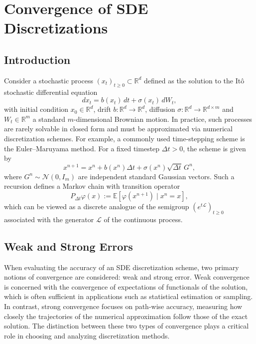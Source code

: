\documentclass{article}
\begin{document}
\section{Convergence of SDE Discretizations}

\subsection{Introduction}

Consider a stochastic process $(x_t)_{t \geq 0} \subset \mathbb{R}^d$ defined as the solution to the Itô stochastic differential equation
\[
dx_t = b(x_t)\,dt + \sigma(x_t)\,dW_t,
\]
with initial condition $x_0 \in \mathbb{R}^d$, drift $b: \mathbb{R}^d \to \mathbb{R}^d$, diffusion $\sigma: \mathbb{R}^d \to \mathbb{R}^{d \times m}$ and $W_t \in \mathbb{R}^m$ a standard $m$-dimensional Brownian motion. In practice, such processes are rarely solvable in closed form and must be approximated via numerical discretization schemes. For example, a commonly used time-stepping scheme is the Euler–Maruyama method. For a fixed timestep $\Delta t > 0$, the scheme is given by
\[
x^{n+1} = x^n + b(x^n)\Delta t + \sigma(x^n)\sqrt{\Delta t}\, G^n,
\]
where $G^n \sim \mathcal{N}(0, I_m)$ are independent standard Gaussian vectors. Such a recursion defines a Markov chain with transition operator
\begin{equation} \label{discrete_transition}
    P_{\Delta t} \varphi(x) := \mathbb{E}[\varphi(x^{n+1}) \mid x^n = x],
\end{equation}
which can be viewed as a discrete analogue of the semigroup $(e^{t\mathcal{L}})_{t \geq 0}$ associated with the generator $\mathcal{L}$ of the continuous process.

\subsection{Weak and Strong Errors}
When evaluating the accuracy of an SDE discretization scheme, two primary notions of convergence are considered: weak and strong error.
Weak convergence is concerned with the convergence of expectations of functionals of the solution, which is often sufficient in applications such as statistical estimation or sampling. In contrast, strong convergence focuses on path-wise accuracy, measuring how closely the trajectories of the numerical approximation follow those of the exact solution. The distinction between these two types of convergence plays a critical role in choosing and analyzing discretization methods.
\end{document}
